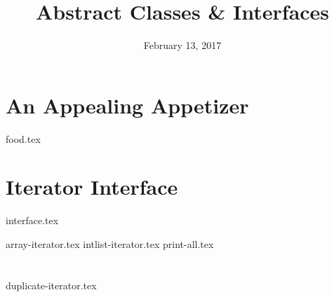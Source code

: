 \documentclass[11pt]{exam}
\title{Abstract Classes \& Interfaces}
\date{February 13, 2017}
\begin{document}
\maketitle

\section{An Appealing Appetizer}
\begin{questions}
{food.tex}
\end{questions}

\clearpage

\section{Iterator Interface}
{interface.tex}
\begin{questions}
{array-iterator.tex}
\clearpage
{intlist-iterator.tex}
{print-all.tex}
\end{questions}

\clearpage

\section{}
\begin{questions}
{duplicate-iterator.tex}
\end{questions}
\end{document}
